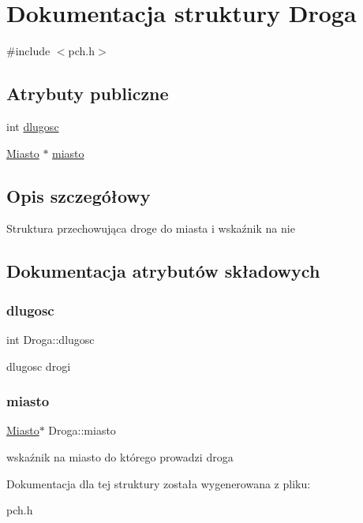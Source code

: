 \hypertarget{struct_droga}{}\section{Dokumentacja struktury Droga}
\label{struct_droga}


{\ttfamily \#include $<$pch.\+h$>$}

\subsection*{Atrybuty publiczne}
\begin{DoxyCompactItemize}
\item 
int \mbox{\hyperlink{struct_droga_a481f70e4ccb9be1b2cbe4fec462b1ce6}{dlugosc}}
\item 
\mbox{\hyperlink{struct_miasto}{Miasto}} $\ast$ \mbox{\hyperlink{struct_droga_a3d92cec36eeeabb30180b1fd452dc248}{miasto}}
\end{DoxyCompactItemize}


\subsection{Opis szczegółowy}
Struktura przechowująca droge do miasta i wskaźnik na nie 

\subsection{Dokumentacja atrybutów składowych}
\mbox{\label{struct_droga_a481f70e4ccb9be1b2cbe4fec462b1ce6}} 
\subsubsection{\texorpdfstring{dlugosc}{dlugosc}}
{\footnotesize\ttfamily int Droga\+::dlugosc}

dlugosc drogi \mbox{\label{struct_droga_a3d92cec36eeeabb30180b1fd452dc248}} 
\subsubsection{\texorpdfstring{miasto}{miasto}}
{\footnotesize\ttfamily \mbox{\hyperlink{struct_miasto}{Miasto}}$\ast$ Droga\+::miasto}

wskaźnik na miasto do którego prowadzi droga 

Dokumentacja dla tej struktury została wygenerowana z pliku\+:\begin{DoxyCompactItemize}
\item 
pch.\+h\end{DoxyCompactItemize}

